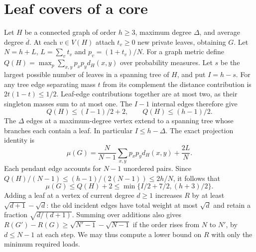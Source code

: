 \documentclass[11pt,a4paper]{article}
\newcommand{\dd}{\overline d}\newcommand{\pos}[1]{(#1)_+}
\begin{document}
\section{Leaf covers of a core}
Let $H$ be a connected graph of order $h\ge3$, maximum degree $\Delta$,
and average degree $\dd$. At each $v\in V(H)$ attach $t_v\ge0$ new
private leaves, obtaining $G$. Let $N=h+L$, $L=\sum_v t_v$ and
$p_v=(1+t_v)/N$. For a graph metric define
$Q(H)=\max_p\sum_{x,y}p_xp_y d_H(x,y)$ over probability measures.
Let $s$ be the largest possible number of leaves in a spanning tree of
$H$, and put $I=h-s$. For any tree edge separating mass $t$ from its
complement the distance contribution is $2t(1-t)\le1/2$. Leaf-edge
contributions together are at most two, as their singleton masses sum
to at most one. The $I-1$ internal edges therefore give
\[
 Q(H)\le (I-1)/2+2,\qquad Q(H)\le(h-1)/2.
\]
The $\Delta$ edges at a maximum-degree vertex extend to a spanning tree
whose branches each contain a leaf. In particular $I\le h-\Delta$.
The exact projection identity is
\[
 \mu(G)=\frac N{N-1}\sum_{x,y}p_xp_y d_H(x,y)+\frac{2L}{N}.
\]
Each pendant edge accounts for $N-1$ unordered pairs. Since
$Q(H)/(N-1)\le(h-1)/(2(N-1))\le2h/N$, it follows that
\begin{equation}\label{p10-distbd}
 \mu(G)\le Q(H)+2\le\min\{I/2+7/2,(h+3)/2\}.
\end{equation}
Adding a leaf at a vertex of current degree $d\ge1$ increases $R$ by
at least $\sqrt{d+1}-\sqrt d$: the old incident edges have total
weight at most $\sqrt d$ and retain a fraction $\sqrt{d/(d+1)}$.
Summing over additions also gives $R(G')-R(G)\ge\sqrt{N'-1}-\sqrt{N-1}$
if the order rises from $N$ to $N'$, by $d\le N-1$ at each step.
We may thus compute a lower bound on $R$ with only the minimum required
loads.
\end{document}
